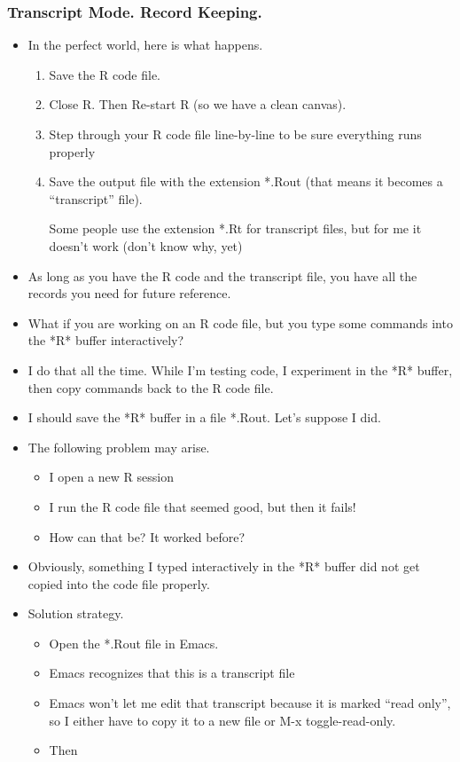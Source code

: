 \documentclass[11pt,english]{beamer}
\begin{document}
\begin{frame}
  \frametitle{Transcript Mode. Record Keeping.}
  \begin{itemize}
  \item In the perfect world, here is what happens.

    \begin{enumerate}
    \item Save the R code file.
    \item Close R. Then Re-start R (so we have a clean canvas).
    \item Step through your R code file line-by-line to be sure everything runs
      properly
    \item Save the output file with the extension {*}.Rout (that means it becomes
      a ``transcript'' file).


      Some people use the extension {*}.Rt for transcript files, but for
      me it doesn't work (don't know why, yet)

    \end{enumerate}
  \item As long as you have the R code and the transcript file, you have all
    the records you need for future reference.
  \item What if you are working on an R code file, but you type some commands
    into the {*}R{*} buffer interactively?
  \item I do that all the time. While I'm testing code, I experiment in the
    {*}R{*} buffer, then copy commands back to the R code file. 
  \item I should save the {*}R{*} buffer in a file {*}.Rout. Let's suppose
    I did.
  \item The following problem may arise. 

    \begin{itemize}
    \item I open a new R session
    \item I run the R code file that seemed good, but then it fails!
    \item How can that be? It worked before?
    \end{itemize}
  \item Obviously, something I typed interactively in the {*}R{*} buffer did
    not get copied into the code file properly.
  \item Solution strategy. 

    \begin{itemize}
    \item Open the {*}.Rout file in Emacs. 
    \item Emacs recognizes that this is a transcript file
    \item Emacs won't let me edit that transcript because it is marked ``read
      only'', so I either have to copy it to a new file or M-x toggle-read-only.
    \item Then


\end{itemize}
\end{itemize}
\end{frame}
\end{document}
